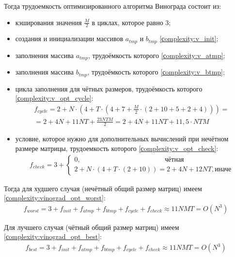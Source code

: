 Тогда трудоемкость оптимизированного алгоритма Винограда состоит из:
\begin{itemize}
	\item кэширования значения $\frac{M}{2}$ в циклах, которое равно 3;
	\item создания и инициализации массивов $a_{tmp}$ и $b_{tmp}$ \ref{сomplexity:v_init};
	\item заполнения массива $a_{tmp}$, трудоёмкость которого \ref{сomplexity:v_atmp};
	\item заполнения массива $b_{tmp}$, трудоёмкость которого \ref{сomplexity:v_btmp};
	\item цикла заполнения для чётных размеров, трудоёмкость которого \ref{сomplexity:v_opt_cycle}:
	\begin{equation}
		\label{сomplexity:v_opt_cycle}
		\begin{aligned}
			f_{cycle} = 2 + N \cdot (4 + T \cdot (4 + 7 + \frac{M}{2} \cdot (2 + 10 + 5 + 2 + 4))) = \\
			= 2 + 4N + 11NT + \frac{23NTM}{2}  = 2 + 4N + 11NT + 11,5 \cdot NTM 
		\end{aligned}
	\end{equation}
	\item условие, которое нужно для дополнительных вычислений при нечётном размере матрицы, трудоемкость которого \ref{сomplexity:v_opt_check}:
	\begin{equation}
		\label{сomplexity:v_opt_check}
		\begin{aligned}
			f_{check} = 3 + 
			\begin{cases}
				0,~~~~~~~~~~~~~~~~~~~~~~~~~~~~~~~~~~~~~~~~~~~~~~~~~~~~~~~~\text{чётная} \\
				2 + N \cdot (4 + T \cdot (2 + 10)) = 2 + 4N + 12NT,\text{иначе}
			\end{cases}
		\end{aligned}  
	\end{equation}
\end{itemize}

Тогда для худшего случая (нечётный общий размер матриц) имеем \ref{сomplexity:vinograd_opt_worst}:
\begin{equation}
	\label{сomplexity:vinograd_opt_worst}
	\begin{aligned}
		f_{worst} = 3 + f_{init} + f_{atmp} + f_{btmp} + f_{cycle} + f_{check} \approx 11NMT = O(N^3)
	\end{aligned}
\end{equation}

Для лучшего случая (чётный общий размер матриц) имеем \ref{сomplexity:vinograd_opt_best}:
\begin{equation}
	\label{сomplexity:vinograd_opt_best}
	\begin{aligned}
		f_{best} = 3 + f_{init} + f_{atmp} + f_{btmp} + f_{cycle} + f_{check} \approx 11NMT = O(N^3)
	\end{aligned}
\end{equation}

